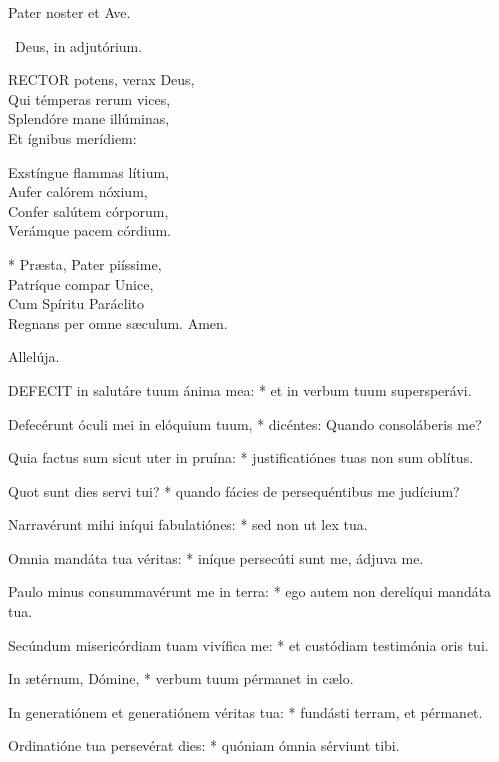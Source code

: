 
Pater noster et Ave.

\V\ Deus, in adjutórium.


\lettrine[lines=2]{R}{ECTOR} potens, verax Deus,\\
Qui témperas rerum vices,\\
Splendóre mane illúminas,\\
Et ígnibus merídiem:

Exstíngue flammas lítium,\\
Aufer calórem nóxium,\\
Confer salútem córporum,\\
Verámque pacem córdium.

* Præsta, Pater piíssime,\\
Patríque compar Unice,\\
Cum Spíritu Paráclito\\
Regnans per omne sæculum. Amen.



 Allelúja.


\lettrine[lines=2]{D}{EFECIT} in salutáre tuum ánima mea: * et in verbum tuum supersperávi.

Defecérunt óculi mei in elóquium tuum, * dicéntes: Quando consoláberis me?

Quia factus sum sicut uter in pruína: * justificatiónes tuas non sum oblítus.

Quot sunt dies servi tui? * quando fácies de persequéntibus me judícium?

Narravérunt mihi iníqui fabulatiónes: * sed non ut lex tua.

Omnia mandáta tua véritas: * iníque persecúti sunt me, ádjuva me.

Paulo minus consummavérunt me in terra: * ego autem non derelíqui mandáta tua.

Secúndum misericórdiam tuam vivífica me: * et custódiam testimónia oris tui.

In ætérnum, Dómine, * verbum tuum pérmanet in cælo.

In generatiónem et generatiónem véritas tua: * fundásti terram, et pérmanet.

Ordinatióne tua persevérat dies: * quóniam ómnia sérviunt tibi.

